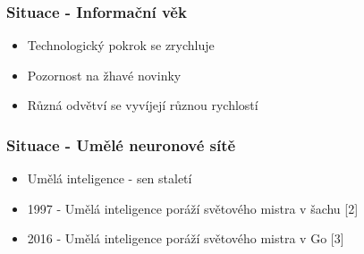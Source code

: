\documentclass[10pt, t]{beamer}
\begin{document}
\begin{frame}

\frametitle{Situace - Informační věk}

\begin{itemize}
	\item Technologický pokrok se zrychluje
	\item<2-> Pozornost na žhavé novinky
	\item<3-> Různá odvětví se vyvíjejí různou rychlostí
\end{itemize}


\end{frame}


\begin{frame}

\frametitle{Situace - Umělé neuronové sítě}

\begin{itemize}
	\item Umělá inteligence - sen staletí
	\item<2-> 1997 - Umělá inteligence poráží světového mistra v šachu [2]
	\item<3-> 2016 - Umělá inteligence poráží světového mistra v Go [3]
\end{itemize}

\end{frame}

\end{document}
